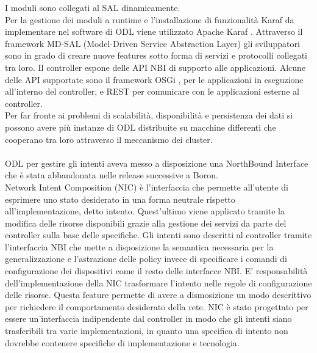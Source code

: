 I moduli sono collegati al SAL dinamicamente.
\\Per la gestione dei moduli a runtime e l'installazione di funzionalità Karaf da implementare nel software di ODL viene utilizzato Apache Karaf \cite{Apache}.
Attraverso il framework MD-SAL (Model-Driven Service Abstraction Layer) gli sviluppatori sono in grado di creare nuove features sotto forma di servizi e protocolli collegati tra loro.
Il controller espone delle API NBI di supporto alle applicazioni. Alcune delle API supportate sono il framework OSGi \cite{osgi}, per le applicazioni in eseguzione all'interno del controller,
e REST per comunicare con le applicazioni esterne al controller.
\\Per far fronte ai problemi di scalabilità, disponibilità e persistenza dei dati si possono avere più instanze di ODL distribuite su macchine differenti che cooperano tra loro attraverso il meccanismo dei cluster.
\\
\\ODL per gestire gli intenti aveva messo a disposizione una NorthBound Interface che è stata abbandonata nelle release successive a Boron.
\\Network Intent Composition (NIC) \cite{nic} è l'interfaccia che permette all'utente di esprimere uno stato desiderato in una forma neutrale rispetto all'implementazione, detto intento. Quest'ultimo viene applicato tramite la modifica delle risorse disponibili 
grazie alla gestione dei servizi da parte del controller sulla base delle specifiche.
Gli intenti sono descritti al controller tramite l'interfaccia NBI che mette a disposizione la semantica necessaria per la generalizzazione e l'astrazione delle policy invece di specificare i comandi di configurazione dei dispositivi come il resto delle interfacce NBI.
E' responsabilità dell'implementazione della NIC trasformare l'intento nelle regole di configurazione delle risorse.
Questa feature permette di avere a dismosizione un modo descrittivo per richiedere il comportamento desiderato della rete.
NIC è stato progettato per essere un'interfaccia indipendente dal controller in modo che gli intenti siano trasferibili tra varie implementazioni, in quanto una specifica di intento non dovrebbe contenere specifiche di implementazione e tecnologia.



